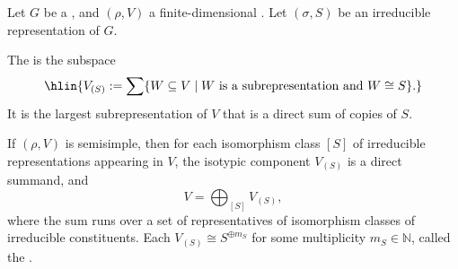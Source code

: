 \begin{definition} \label{definition:isotypic_component_of_a_representation_of_a_lie_group_over_a_field_for_an_irreducible_representation}

    Let $G$ be a , and $(\rho, V)$ a finite-dimensional . Let $(\sigma, S)$ be an irreducible representation of $G$.

    The  is the subspace
    $$\hlin{V_{(S)} := \sum \{W \subseteq V \mid W \text{ is a subrepresentation and } W \cong S\}.}$$
    It is the largest subrepresentation of $V$ that is a direct sum of copies of $S$.

    If $(\rho, V)$ is semisimple, then for each isomorphism class $[S]$ of irreducible representations appearing in $V$, the isotypic component $V_{(S)}$ is a direct summand, and
    $$ V = \bigoplus_{[S]} V_{(S)},$$
    where the sum runs over a set of representatives of isomorphism classes of irreducible constituents. Each $V_{(S)} \cong S^{\oplus m_S}$ for some multiplicity $m_S \in \mathbb{N}$, called the .
\end{definition}

